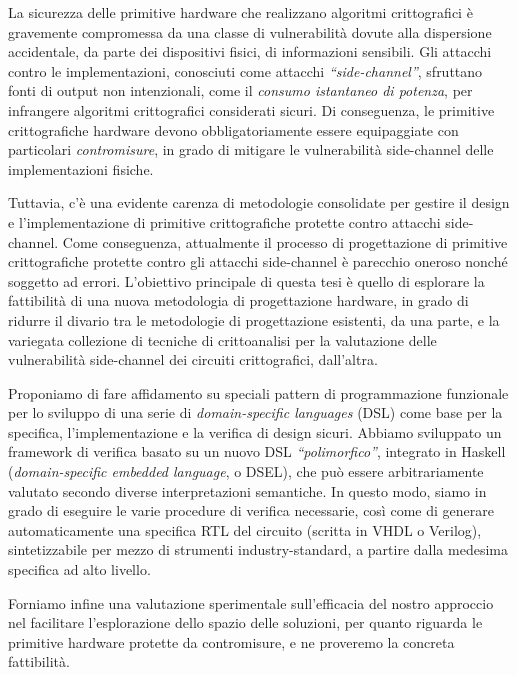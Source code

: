 
La sicurezza delle primitive hardware che realizzano algoritmi crittografici è gravemente 
compromessa da una classe di vulnerabilità dovute alla dispersione accidentale, da parte dei 
dispositivi fisici, di informazioni sensibili. 
Gli attacchi contro le implementazioni, conosciuti come attacchi \emph{``side-channel''},
sfruttano fonti di output non intenzionali, %
come il \emph{consumo istantaneo di potenza}, per infrangere algoritmi crittografici 
considerati sicuri.
Di conseguenza, le primitive crittografiche hardware devono obbligatoriamente essere 
equipaggiate con particolari \emph{contromisure}, in grado di mitigare le vulnerabilità 
side-channel delle implementazioni fisiche. 

Tuttavia, c'è una evidente carenza di metodologie consolidate per gestire
il design e l'implementazione di primitive crittografiche protette contro attacchi side-channel.
Come conseguenza, attualmente il processo di progettazione di primitive crittografiche protette 
contro gli attacchi side-channel è parecchio oneroso nonché soggetto ad errori. 
L'obiettivo principale di questa tesi è quello di esplorare la fattibilità di una nuova metodologia di 
progettazione hardware, in grado di ridurre il divario %
tra le metodologie di progettazione esistenti, da una parte, e la variegata collezione di tecniche 
di crittoanalisi per la valutazione delle vulnerabilità side-channel dei circuiti crittografici, dall'altra.

Proponiamo di fare affidamento su speciali pattern di programmazione funzionale per lo sviluppo 
di una serie di \emph{domain-specific languages} (DSL) come base per la specifica, 
l'implementazione e la verifica di design sicuri.
Abbiamo sviluppato un framework di verifica basato su un nuovo DSL \emph{``polimorfico''}, 
integrato in Haskell (\emph{domain-specific embedded language}, o DSEL), che può essere 
arbitrariamente valutato secondo diverse interpretazioni semantiche.
In questo modo, siamo in grado di eseguire le varie procedure di verifica necessarie, così come 
di generare automaticamente una specifica RTL del circuito (scritta in VHDL o Verilog), 
sintetizzabile per mezzo di strumenti industry-standard, a partire dalla medesima specifica ad 
alto livello.

Forniamo infine una valutazione sperimentale sull'efficacia del nostro approccio nel facilitare 
l'esplorazione dello spazio delle soluzioni, per quanto riguarda le primitive hardware protette da 
contromisure, e ne proveremo la concreta fattibilità.